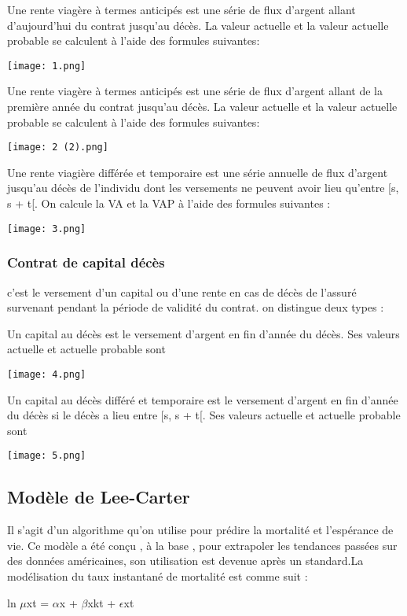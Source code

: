 \documentclass{article}
\begin{document}
{{\large Une rente viagère à termes anticipés est une série de flux d'argent allant d'aujourd'hui  du contrat jusqu'au décès. La valeur actuelle et la valeur actuelle probable se calculent à l'aide des formules suivantes:  }

\texttt{[image: 1.png]}
{}

{\large Une rente viagère à termes anticipés est une série de flux d'argent allant de la première année du contrat jusqu'au décès. La valeur actuelle et la valeur actuelle probable se calculent à l'aide des formules suivantes: }

\texttt{[image: 2 (2).png]}

{\large Une rente viagière différée et temporaire est une série annuelle de flux d'argent jusqu’au décès
de l’individu dont les versements ne peuvent avoir lieu qu’entre [s, s + t[. On calcule la VA et la VAP à l'aide des formules suivantes :  }

\texttt{[image: 3.png]}


\subsubsection{Contrat de capital décès}
{\large c'est le versement d'un capital ou d'une rente en cas de décès de l'assuré survenant pendant la période de validité du contrat. on distingue deux types : }

{\large Un capital au décès est le versement d'argent en fin d’année du décès. Ses valeurs actuelle et
actuelle probable sont}

\texttt{[image: 4.png]}

{\large Un capital au décès différé et temporaire est le versement d'argent en fin d’année du décès si le décès a lieu entre [s, s + t[. Ses valeurs actuelle et actuelle probable sont}

\texttt{[image: 5.png]}


\subsection{Modèle de Lee-Carter}
{\large Il s'agit d'un algorithme qu'on utilise pour prédire la mortalité et l'espérance de vie. 
Ce modèle a été conçu , à la base , pour extrapoler les tendances passées sur des données américaines, son utilisation est devenue après un standard.La modélisation du taux instantané de mortalité est comme suit :}
\begin{center}
    {\large ln $\mu$xt = $\alpha$x + $\beta$xkt + $\epsilon$xt }
\end{center}

}
\end{document}
